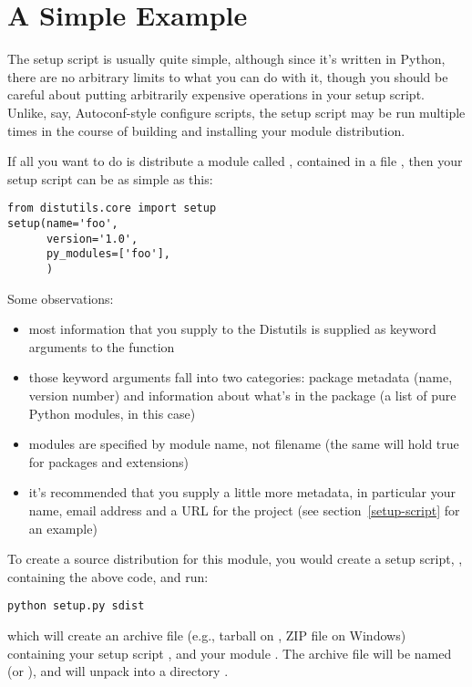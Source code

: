 \documentclass{manual}
\begin{document}
\section{A Simple Example}
\label{simple-example}

The setup script is usually quite simple, although since it's written
in Python, there are no arbitrary limits to what you can do with it,
though you should be careful about putting arbitrarily expensive
operations in your setup script. Unlike, say, Autoconf-style configure
scripts, the setup script may be run multiple times in the course of
building and installing your module distribution.  

If all you want to do is distribute a module called ,
contained in a file , then your setup script can be as
simple as this:

\begin{verbatim}
from distutils.core import setup
setup(name='foo',
      version='1.0',
      py_modules=['foo'],
      )
\end{verbatim}

Some observations:
\begin{itemize}
\item most information that you supply to the Distutils is supplied as
  keyword arguments to the  function
\item those keyword arguments fall into two categories: package
  metadata (name, version number) and information about what's in the
  package (a list of pure Python modules, in this case)
\item modules are specified by module name, not filename (the same will
  hold true for packages and extensions)
\item it's recommended that you supply a little more metadata, in
  particular your name, email address and a URL for the project
  (see section~\ref{setup-script} for an example)
\end{itemize}

To create a source distribution for this module, you would create a
setup script, , containing the above code, and run:

\begin{verbatim}
python setup.py sdist
\end{verbatim}

which will create an archive file (e.g., tarball on \UNIX, ZIP file on
Windows) containing your setup script , and your module
.  The archive file will be named  (or
), and will unpack into a directory .
\end{document}

